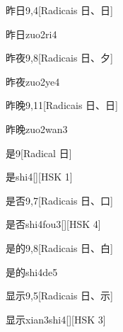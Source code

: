 \begin{entry}{昨日}{9,4}[Radicais ⽇、⽇]
  \begin{phonetics}{昨日}{zuo2ri4}
  \end{phonetics}
\end{entry}

\begin{entry}{昨夜}{9,8}[Radicais ⽇、⼣]
  \begin{phonetics}{昨夜}{zuo2ye4}
  \end{phonetics}
\end{entry}

\begin{entry}{昨晚}{9,11}[Radicais ⽇、⽇]
  \begin{phonetics}{昨晚}{zuo2wan3}
  \end{phonetics}
\end{entry}

\begin{entry}{是}{9}[Radical ⽇]
  \begin{phonetics}{是}{shi4}[][HSK 1]
  \end{phonetics}
\end{entry}

\begin{entry}{是否}{9,7}[Radicais ⽇、⼝]
  \begin{phonetics}{是否}{shi4fou3}[][HSK 4]
  \end{phonetics}
\end{entry}

\begin{entry}{是的}{9,8}[Radicais ⽇、⽩]
  \begin{phonetics}{是的}{shi4de5}
  \end{phonetics}
\end{entry}

\begin{entry}{显示}{9,5}[Radicais ⽇、⽰]
  \begin{phonetics}{显示}{xian3shi4}[][HSK 3]
  \end{phonetics}
\end{entry}

